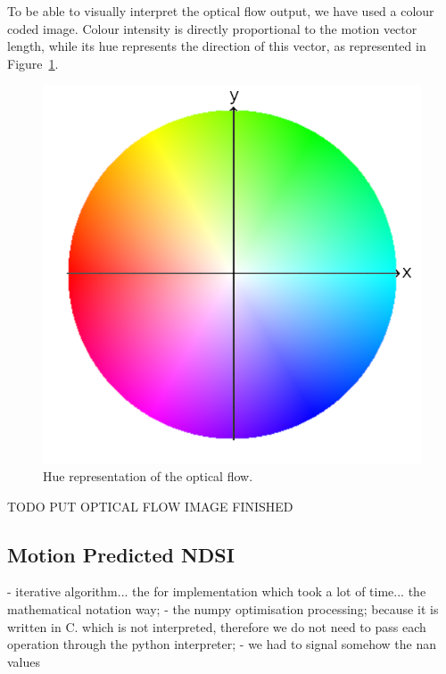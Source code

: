 \documentclass[11pt, a4paper]{report}
\begin{document}
	To be able to visually interpret the optical flow output, we have used a colour coded image. Colour intensity is directly proportional to the motion vector length, while its hue represents the direction of this vector, as represented in Figure~\ref{fig:hue_colour_wheel}.
	\begin{figure}[h!]
		\centering
		\includegraphics[scale=0.3]{../images/colorwheel.png}
		\caption{Hue representation of the optical flow.}
		\label{fig:hue_colour_wheel}
	\end{figure}
	
	TODO PUT OPTICAL FLOW IMAGE FINISHED
	

	\subsection{Motion Predicted NDSI}
	\label{seq:motion_ndsi_implementation}
	- iterative algorithm... the for implementation which took a lot of time... the mathematical notation way;
	- the numpy optimisation processing; because it is written in C. which is not interpreted, therefore we do not need to pass each operation through the python interpreter;
	- we had to signal somehow the nan values
	
\end{document}
